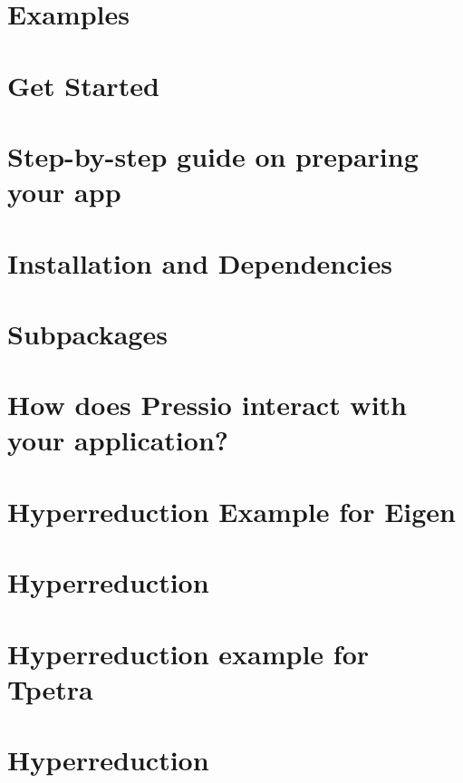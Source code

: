 \documentclass[twoside]{book}
\newcommand{\+}{\discretionary{\mbox{\scriptsize$\hookleftarrow$}}{}{}}
\begin{document}
\chapter{Examples}
\label{autotoc_md13}

\chapter{Get Started}
\label{autotoc_md14}

\chapter{Step-\/by-\/step guide on preparing your app}
\label{autotoc_md15}

\chapter{Installation and Dependencies}
\label{autotoc_md16}

\chapter{Subpackages}
\label{autotoc_md19}

\chapter{How does Pressio interact with your application?}
\label{autotoc_md20}

\chapter{Hyperreduction Example for Eigen}
\label{autotoc_md21}

\chapter{Hyperreduction}
\label{autotoc_md22}

\chapter{Hyperreduction example for Tpetra}
\label{autotoc_md23}

\chapter{Hyperreduction}
\label{autotoc_md24}

\end{document}
